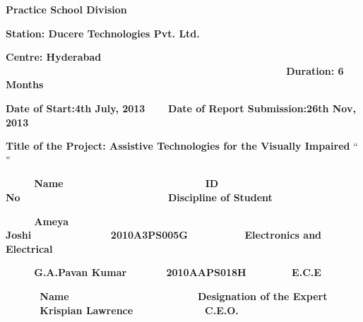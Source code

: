 \documentclass[11pt]{report}
\begin{document}
\newpage
\bigskip

{\centering{}\bfseries
Practice School Division
\par}


\bigskip


\bigskip

{\bfseries
Station: Ducere Technologies Pvt. Ltd. }

{
\textbf{Centre: Hyderabad
\ \ \ \ \ }\ \ \ \ \ \ \ \ \ \ \ \ \ \ \ \ \ \ \ \ \ \ \ \ \ \ \ \ \ \ \ \ \ \ \ \ \ \ \ \ \ \ \ \ \ \ \ \ \ \ \ \textbf{Duration: 6 Months
}\ }

{
\textbf{Date of Start}\textbf{:4th July, 2013} \ \ \ \ \textbf{Date of Report
Submission:26th Nov, 2013}}


\bigskip


\bigskip

{
\textbf{Title of the Project: Assistive Technologies for the Visually Impaired
}{\textquotedblleft}\textbf{\textcolor{black}{
}}\textcolor{black}{{\textquotedblright}}}


\bigskip


\bigskip


\bigskip

{\bfseries
\ \ \ \ \ Name\ \ \ \ \ \ \ \ \  \ \ \ \ \ \ \ \ \ \ \ \ \ \ \ \ ID No\ \ \ \ \ \ \ \ \ \ \  \ \ \ \ \ \ \ \ \ \ \  
\ \ \ \ Discipline of Student}

{\bfseries
\ \ \ \ \ Ameya Joshi\ \ \ \ \ \   \ \ \ \ \ \ \ \ 2010A3PS005G\ \ \ \ \ \ 
\ \ \ \ Electronics and Electrical}

{\bfseries
\ \ \ \ \ G.A.Pavan Kumar\ \ \ \ \ \ \ 2010AAPS018H\ \ \ \ \ \ 
\ \ E.C.E}

\bigskip

{\bfseries
\ \ \ \ \ \ Name \ \ \ \ \ \ \ \ \ \ \ \ \ \ \ \ \ \ \ \ \ \ Designation of the Expert}\newline
{\bfseries
\ \ \ \ \ \ Krispian Lawrence \ \ \ \ \ \ \ \ \ \ \ \ C.E.O.}


\bigskip


\bigskip


\bigskip
\end{document}
